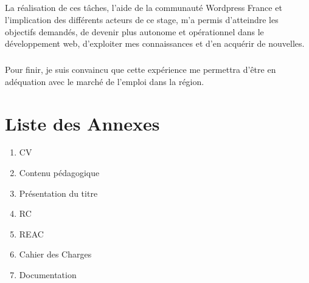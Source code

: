 \documentclass[11pt,a4paper]{report}
\begin{document}
	\paragraph*{}La réalisation de ces tâches, l'aide de la communauté Wordpress France et l'implication des différents acteurs de ce stage, m'a permis d'atteindre les objectifs demandés, de devenir plus autonome et opérationnel dans le développement web, d'exploiter mes connaissances et d'en acquérir de nouvelles.
	\paragraph*{}Pour finir, je suis convaincu que cette expérience me permettra d'être en adéquation avec le marché de l'emploi dans la région.
	


\chapter{Liste des Annexes}
	\begin{enumerate}
		\item CV
		\item Contenu pédagogique
		\item Présentation du titre
		\item RC
		\item REAC
		\item Cahier des Charges
		\item Documentation
	\end{enumerate}


\listoffigures {}
\listoftables
\end{document}
